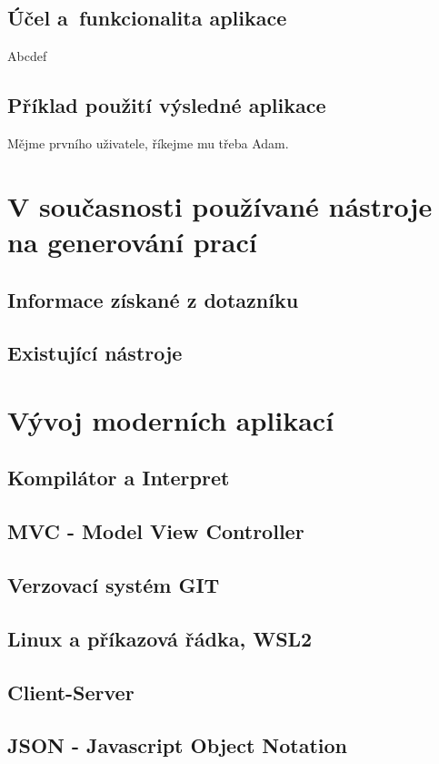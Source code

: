 \documentclass[14pt,a4paper]{article}
\begin{document}
        \subsection{Účel a~funkcionalita aplikace}
        Abcdef
        \subsection{Příklad použití výsledné aplikace}
        Mějme prvního uživatele, říkejme mu třeba Adam.
        
    \section{V současnosti používané nástroje na generování prací}
        \subsection{Informace získané z dotazníku}
        \subsection{Existující nástroje}
	
    \section{Vývoj moderních aplikací}
        \subsection{Kompilátor a Interpret}
        \subsection{MVC - Model View Controller}
        \subsection{Verzovací systém GIT}
        \subsection{Linux a příkazová řádka, WSL2}
        \subsection{Client-Server}
        \subsection{JSON - Javascript Object Notation}
\end{document}
